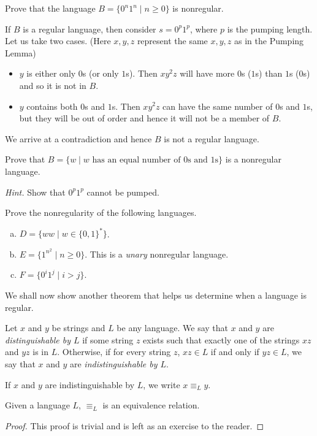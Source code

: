 \begin{exercise}
Prove that the language $B=\{0^n1^n\mid n\geq 0\}$ is nonregular.
\end{exercise}
\begin{solution}
If $B$ is a regular language, then consider $s=0^p1^p$, where $p$ is the pumping length. Let us take two cases. (Here $x,y,z$ represent the same $x,y,z$ as in the Pumping Lemma)
\begin{itemize}
    \item  $y$ is either only $0$s (or only $1$s). Then $xy^2z$ will have more $0$s ($1$s) than $1$s ($0$s) and so it is not in $B$.
    \item $y$ contains both $0$s and $1$s. Then $xy^2z$ can have the same number of $0$s and $1$s, but they will be out of order and hence it will not be a member of $B$.
\end{itemize}
We arrive at a contradiction and hence $B$ is not a regular language.
\end{solution}
\begin{exercise}
Prove that $B=\{w\mid w\text{ has an equal number of $0$s and $1$s}\}$ is a nonregular language.
\end{exercise}
\textit{Hint. }Show that $0^p1^p$ cannot be pumped.

\begin{exercise}
Prove the nonregularity of the following languages.
\begin{enumerate}[(a)]
    \item $D=\{ww\mid w\in\{0,1\}^*\}$.
    \item $E=\{1^{n^2}\mid n\geq 0\}$. This is a \textit{unary} nonregular language.
    \item $F=\{0^i1^j\mid i>j\}$.
\end{enumerate}
\end{exercise}

We shall now show another theorem that helps us determine when a language is regular.
\begin{definition}
Let $x$ and $y$ be strings and $L$ be any language. We say that $x$ and $y$ are \textit{distinguishable by $L$} if some string $z$ exists such that exactly one of the strings $xz$ and $yz$ is in $L$. Otherwise, if for every string $z$, $xz\in L$ if and only if $yz\in L$, we say that $x$ and $y$ are \textit{indistinguishable by $L$}.
\end{definition}

If $x$ and $y$ are indistinguishable by $L$, we write $x\equiv_Ly$.
\begin{lemma}
Given a language $L$, $\equiv_L$ is an equivalence relation.
\end{lemma}
\begin{proof}
This proof is trivial and is left as an exercise to the reader.
\end{proof}

